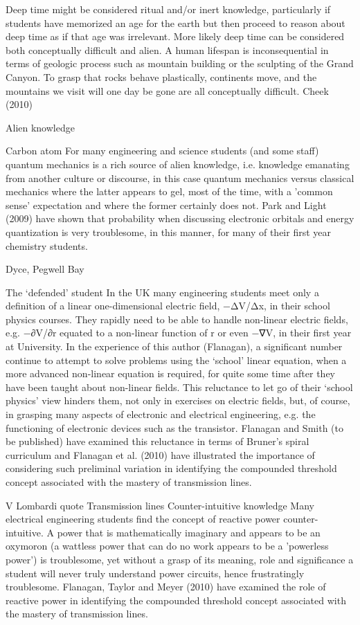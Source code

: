 \documentclass{tufte-book}\usepackage[]{graphicx}\usepackage[]{xcolor}
\begin{document}
Deep time might be considered ritual and/or inert knowledge, particularly if students have memorized an age for the earth but then proceed to reason about deep time as if that age was irrelevant. More likely deep time can be considered both conceptually difficult and alien. A human lifespan is inconsequential in terms of geologic process such as mountain building or the sculpting of the Grand Canyon. To grasp that rocks behave plastically, continents move, and the mountains we visit will one day be gone are all conceptually difficult. Cheek (2010)

Alien knowledge

Carbon atom	For many engineering and science students (and some staff) quantum mechanics is a rich source of alien knowledge, i.e. knowledge emanating from another culture or discourse, in this case quantum mechanics versus classical mechanics where the latter appears to gel, most of the time, with a 'common sense' expectation and where the former certainly does not. Park and Light (2009) have shown that probability when discussing electronic orbitals and energy quantization is very troublesome, in this manner, for many of their first year chemistry students.

Dyce, Pegwell Bay

The ‘defended’ student
In the UK many engineering students meet only a definition of a linear one-dimensional electric field, −ΔV/Δx, in their school physics courses. They rapidly need to be able to handle non-linear electric fields, e.g. −∂V/∂r equated to a non-linear function of r or even −∇V, in their first year at University. In the experience of this author (Flanagan), a significant number continue to attempt to solve problems using the ‘school’ linear equation, when a more advanced non-linear equation is required, for quite some time after they have been taught about non-linear fields. This reluctance to let go of their ‘school physics’ view hinders them, not only in exercises on electric fields, but, of course, in grasping many aspects of electronic and electrical engineering, e.g. the functioning of electronic devices such as the transistor. Flanagan and Smith (to be published) have examined this reluctance in terms of Bruner’s spiral curriculum and Flanagan et al. (2010) have illustrated the importance of considering such preliminal variation in identifying the compounded threshold concept associated with the mastery of transmission lines.

      V Lombardi quote
Transmission lines      	Counter-intuitive knowledge
Many electrical engineering students find the concept of reactive power counter-intuitive. A power that is mathematically imaginary and appears to be an oxymoron (a wattless power that can do no work appears to be a 'powerless power’) is troublesome, yet without a grasp of its meaning, role and significance a student will never truly understand power circuits, hence frustratingly troublesome. Flanagan, Taylor and Meyer (2010) have examined the role of reactive power in identifying the compounded threshold concept associated with the mastery of transmission lines.
\end{document}
